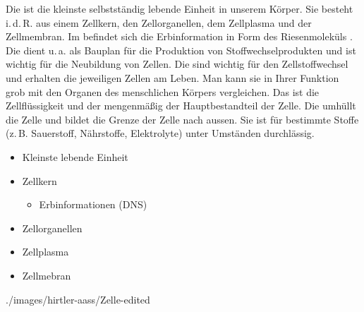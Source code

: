 {%
Die  ist die kleinste selbstständig lebende Einheit in unserem
Körper. 
%
Sie besteht i.\,d.\,R. aus einem 
Zellkern, 
den Zellorganellen, 
dem Zellplasma 
und der Zellmembran.
%
Im  befindet sich die Erbinformation in Form des Riesenmoleküls 
.
%
Die  dient 
u.\,a. als Bauplan für die Produktion von 
Stoffwechselprodukten
und ist wichtig für die Neubildung von Zellen.
%
Die 
sind wichtig für den Zellstoffwechsel
und erhalten die jeweiligen Zellen am Leben. 
%
Man kann sie in Ihrer Funktion grob mit den Organen des menschlichen Körpers 
vergleichen.
%
Das  ist die Zellflüssigkeit und der mengenmäßig der 
Hauptbestandteil der Zelle. 
%
Die  umhüllt die Zelle 
und bildet die Grenze der Zelle nach aussen. 
%
Sie ist für 
bestimmte Stoffe 
(z.\,B. Sauerstoff, Nährstoffe, Elektrolyte) 
unter Umständen  durchlässig. 
\cite{AlbertsMolZellbiologie2,LoefflerBiochemie7}
}{
\begin{itemize}
    \item Kleinste lebende Einheit
    \item Zellkern
    \begin{itemize}
        \item Erbinformationen (DNS)
    \end{itemize}
    \item Zellorganellen
    \item Zellplasma
    \item Zellmebran
\end{itemize}
}
{}{}{}




{}
{}
{}
{}
{./images/hirtler-aass/Zelle-edited}
{}

